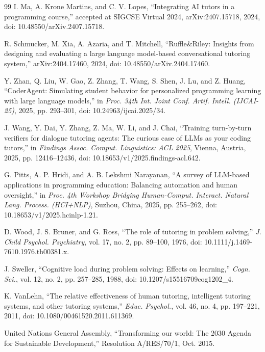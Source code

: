 \begin{thebibliography}{99}
I. Ma, A. Krone Martins, and C. V. Lopes,
``Integrating AI tutors in a programming course,''
accepted at SIGCSE Virtual 2024, arXiv:2407.15718, 2024,
doi: 10.48550/arXiv.2407.15718.

R. Schmucker, M. Xia, A. Azaria, and T. Mitchell,
``Ruffle\&Riley: Insights from designing and evaluating a large language model-based conversational tutoring system,''
arXiv:2404.17460, 2024,
doi: 10.48550/arXiv.2404.17460.

Y. Zhan, Q. Liu, W. Gao, Z. Zhang, T. Wang, S. Shen, J. Lu, and Z. Huang,
``CoderAgent: Simulating student behavior for personalized programming learning with large language models,''
in \textit{Proc. 34th Int. Joint Conf. Artif. Intell. (IJCAI-25)},
2025, pp. 293--301,
doi: 10.24963/ijcai.2025/34.

J. Wang, Y. Dai, Y. Zhang, Z. Ma, W. Li, and J. Chai,
``Training turn-by-turn verifiers for dialogue tutoring agents: The curious case of LLMs as your coding tutors,''
in \textit{Findings Assoc. Comput. Linguistics: ACL 2025},
Vienna, Austria, 2025, pp. 12416--12436,
doi: 10.18653/v1/2025.findings-acl.642.

G. Pitts, A. P. Hridi, and A. B. Lekshmi Narayanan,
``A survey of LLM-based applications in programming education: Balancing automation and human oversight,''
in \textit{Proc. 4th Workshop Bridging Human-Comput. Interact. Natural Lang. Process. (HCI+NLP)},
Suzhou, China, 2025, pp. 255--262,
doi: 10.18653/v1/2025.hcinlp-1.21.

D. Wood, J. S. Bruner, and G. Ross,
``The role of tutoring in problem solving,''
\textit{J. Child Psychol. Psychiatry},
vol. 17, no. 2, pp. 89--100,
1976, doi: 10.1111/j.1469-7610.1976.tb00381.x.

J. Sweller,
``Cognitive load during problem solving: Effects on learning,''
\textit{Cogn. Sci.},
vol. 12, no. 2, pp. 257--285,
1988, doi: 10.1207/s15516709cog1202\_4.

K. VanLehn,
``The relative effectiveness of human tutoring, intelligent tutoring systems, and other tutoring systems,''
\textit{Educ. Psychol.},
vol. 46, no. 4, pp. 197--221,
2011, doi: 10.1080/00461520.2011.611369.

United Nations General Assembly,
``Transforming our world: The 2030 Agenda for Sustainable Development,''
Resolution A/RES/70/1, Oct. 2015.


\end{thebibliography}
